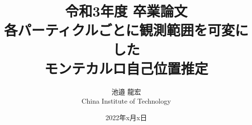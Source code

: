 \documentclass[a4paper,11pt]{jsbook}
\begin{document}
\title{令和3年度 卒業論文\\
各パーティクルごとに観測範囲を可変にした\\モンテカルロ自己位置推定}

\author{池邉 龍宏 \\
China Institute of Technology}

\date{2022年x月x日}

\maketitle





\tableofcontents



\cleardoublepage
{}
 





% 




\newpage
\printindex
\end{document}

